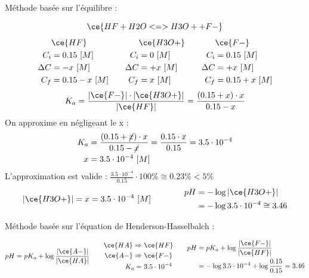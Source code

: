 \documentclass[
  11pt,
  french,
  a4paper,
  openany]{book}
\begin{document}
\begin{Answer}
Méthode basée sur l'équilibre :

\[
\ce{HF + H2O <=> H3O+ + F-}
\]
\[
\begin{split}
&\ce{HF}\\
C_i &= 0.15\ [M] \\
\Delta C &= - x\ [M] \\
C_f &= 0.15 - x\ [M] \\
\end{split}
\qquad
\begin{split}
&\ce{H3O+}\\
C_i &= 0\ [M] \\
\Delta C &= + x\ [M] \\
C_f &= x\ [M] \\
\end{split}
\qquad
\begin{split}
&\ce{F-}\\
C_i &= 0.15\ [M] \\
\Delta C &= + x\ [M] \\
C_f &= 0.15 + x\ [M] \\
\end{split}
\]
\[
K_a = \frac{|\ce{F-}| \cdot |\ce{H3O+}|}{|\ce{HF}|} = \frac{(0.15 + x) \cdot x}{0.15 - x}
\]
On approxime en négligeant le x :
\[
\begin{split}
K_a &= \frac{(0.15 + \cancel{x}) \cdot x}{0.15 - \cancel{x}} = \frac{0.15 \cdot x}{0.15} = 3.5 \cdot 10^{-4} \\
x &= 3.5 \cdot 10^{-4}\ [M]
\end{split}
\]
L'approximation est valide : \(\frac{3.5 \cdot 10^{-4}}{0.15} \cdot 100\% \cong 0.23\% < 5\%\)
\[
\begin{split}
|\ce{H3O+}| = x = 3.5 \cdot 10^{-4}\ [M]
\end{split}
\qquad\qquad
\begin{split}
pH &= - \log |\ce{H3O+}| \\
 &= - \log 3.5 \cdot 10^{-4} \cong 3.46
\end{split}
\]

Méthode basée sur l'équation de Henderson-Hasselbalch :

\[
\begin{split}
  pH = pK_a + \log \frac{|\ce{A-}|}{|\ce{HA}|}
\end{split}
\qquad
\begin{split}
  \ce{HA} \Rightarrow &\ \ce{HF} \\
  \ce{A-} \Rightarrow &\ \ce{F-} \\
  K_a = &\ 3.5 \cdot 10^{-4}
\end{split}
\qquad
\begin{split}
  pH &= pK_a + \log \frac{|\ce{F-}|}{|\ce{HF}|} \\
  &= - \log 3.5 \cdot 10^{-4} + \log \frac{0.15}{0.15} = 3.46 \\
\end{split}
\]

\end{Answer}
\end{document}
